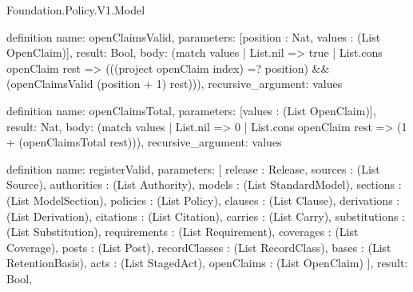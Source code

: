 \begin{lexlean}{Foundation.Policy.V1.Model}
\begin{semanticmodule}
definition{
  name: openClaimsValid,
  parameters: [position : Nat, values : (List OpenClaim)],
  result: Bool,
  body: (match values
    | List.nil => true
    | List.cons openClaim rest => (((project openClaim index) =? position) && (openClaimsValid (position + 1) rest))),
  recursive_argument: values
}

definition{
  name: openClaimsTotal,
  parameters: [values : (List OpenClaim)],
  result: Nat,
  body: (match values | List.nil => 0 | List.cons openClaim rest => (1 + (openClaimsTotal rest))),
  recursive_argument: values
}

definition{
  name: registerValid,
  parameters: [
    release : Release,
    sources : (List Source),
    authorities : (List Authority),
    models : (List StandardModel),
    sections : (List ModelSection),
    policies : (List Policy),
    clauses : (List Clause),
    derivations : (List Derivation),
    citations : (List Citation),
    carries : (List Carry),
    substitutions : (List Substitution),
    requirements : (List Requirement),
    coverages : (List Coverage),
    posts : (List Post),
    recordClasses : (List RecordClass),
    bases : (List RetentionBasis),
    acts : (List StagedAct),
    openClaims : (List OpenClaim)
  ],
  result: Bool,
}
\end{semanticmodule}
\end{lexlean}
